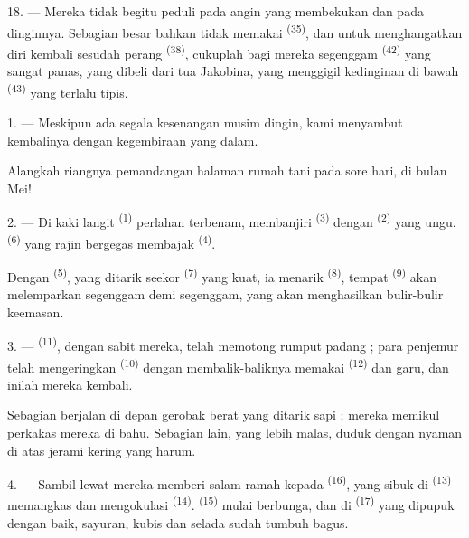 18. --- Mereka tidak begitu peduli pada angin yang membekukan dan
pada dinginnya. Sebagian besar bahkan tidak memakai 
\textsuperscript{(35)}, dan untuk menghangatkan diri kembali sesudah
perang  \textsuperscript{(38)}, cukuplah bagi mereka
segenggam  \textsuperscript{(42)} yang sangat
panas, yang dibeli dari  tua Jakobina, yang
menggigil kedinginan di bawah 
\textsuperscript{(43)} yang terlalu tipis.

\VUsaut{3.0mm}
\VUsaut{3.0mm}

\VUsaut{4.0mm}

1. --- Meskipun ada segala kesenangan musim dingin, kami menyambut
kembalinya  dengan kegembiraan yang dalam.

Alangkah riangnya pemandangan halaman rumah tani pada sore hari, di
bulan Mei!

2. --- Di kaki langit  \textsuperscript{(1)} perlahan
terbenam, membanjiri  \textsuperscript{(3)} dengan
 \textsuperscript{(2)} yang ungu. 
\textsuperscript{(6)} yang rajin bergegas membajak 
\textsuperscript{(4)}.

Dengan  \textsuperscript{(5)}, yang ditarik seekor
 \textsuperscript{(7)} yang kuat, ia menarik 
\textsuperscript{(8)}, tempat 
\textsuperscript{(9)} akan melemparkan  segenggam demi
segenggam, yang akan menghasilkan bulir-bulir keemasan.

3. ---  \textsuperscript{(11)}, dengan
sabit mereka, telah memotong rumput padang ; para penjemur telah
mengeringkan  \textsuperscript{(10)} dengan
membalik-baliknya memakai  \textsuperscript{(12)}
dan garu, dan inilah mereka kembali.

Sebagian berjalan di depan gerobak berat yang ditarik sapi ; mereka
memikul perkakas mereka di bahu. Sebagian lain, yang lebih malas,
duduk dengan nyaman di atas jerami kering yang harum.

4. --- Sambil lewat mereka memberi salam ramah kepada  \textsuperscript{(16)}, yang sibuk di 
\textsuperscript{(13)} memangkas  dan
mengokulasi  \textsuperscript{(14)}.  \textsuperscript{(15)} mulai berbunga, dan di  \textsuperscript{(17)} yang dipupuk dengan baik, sayuran, kubis
dan selada sudah tumbuh bagus.

